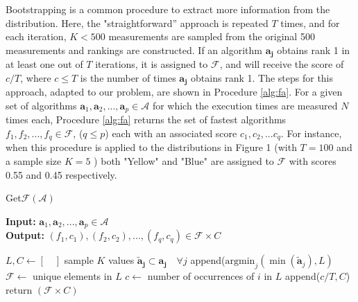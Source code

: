 \documentclass[conference]{IEEEtran}
\begin{document}
 Bootstrapping\cite{bootstrap} is a common procedure to extract more information from the distribution. Here, the "straightforward'' approach is repeated $T$ times, and for each iteration, $K < 500$ measurements are sampled from the original 500 measurements and rankings are constructed. If an algorithm $\mathbf{a_j}$ obtains rank 1 in at least one out of $T$ iterations, it is assigned to $\mathcal{F}$, and will
 receive the score of  $c/T$, where $c \le T$ is the number of times $\mathbf{a_j}$ obtains rank 1. The steps for
 this approach, adapted to our problem, are shown in Procedure \ref{alg:fa}. For a given set of algorithms $
 \mathbf{a}_1,\mathbf{a}_2 ,..., \mathbf{a}_p\in \mathcal{A}$ for which the execution times are measured $N$ times each,
 Procedure \ref{alg:fa} returns the set of fastest algorithms $f_1, f_2, ..., f_q \in  \mathcal{F}$, ($q \le p$) each with an associated score $c_1,c_2,...c_q$.
 For instance, when this procedure is applied to the distributions in Figure 1 (with $T=100$ and a sample size $K=5$ ) both "Yellow" and "Blue" are assigned to $\mathcal{F}$ with scores 0.55 and 0.45 respectively. 

\begin{algorithm}
	\caption{ Get$\mathcal{F}$$(\mathcal{A})$ }
	\label{alg:fa}
	\hspace*{\algorithmicindent} \textbf{Input: } $ \mathbf{a}_1,\mathbf{a}_2 ,..., \mathbf{a}_p\in \mathcal{A}$ \\
	\hspace*{\algorithmicindent} \textbf{Output: } $ (f_1,c_1), (f_2, c_2), ..., (f_q,c_q) \in \mathcal{F} \times C  $
	\begin{algorithmic}[1] 
		\State $L, C \leftarrow [ \quad ]$ 
		\State sample $K$ values $\mathbf{\tilde{a}_{j}} \subset \mathbf{a_j} \quad \forall j$  
		\State append($\text{argmin}_j(\min(\mathbf{\tilde{a}}_j ), L)$ 
		\EndFor
		\State $\mathcal{F} \leftarrow $ unique elements in $L$ 
		\State $c \leftarrow$ number of occurrences of $i$ in $L$ 
		\State append($c/T, C$)
		\EndFor
		\State return $(\mathcal{F} \times C)$
        \end{algorithmic}    
\end{algorithm}
\end{document}
